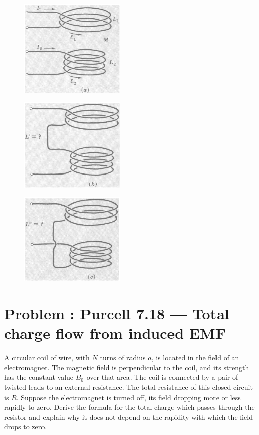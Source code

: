 \documentclass[problems]{esg8022pset}
\begin{document}
  \begin{figure}[H]
    \centering
    \includegraphics[width = 5cm]{pu711a}
    \label{fig:pu711a}
  \end{figure}


  \begin{figure}[H]
    \centering
    \includegraphics[width = 5cm]{pu711b}
    \label{fig:pu711b}
  \end{figure}

  \begin{figure}[H]
    \centering
    \includegraphics[width = 5cm]{pu711c}
    \label{fig:pu711c}
  \end{figure}


\section{Problem \thesection: Purcell 7.18 --- Total charge flow from induced EMF}
A circular coil of wire, with $N$ turns of radius $a$, is located in the field of an electromagnet.
The magnetic field is perpendicular to the coil, and its strength has the constant value $B_{0}$ over that area.
The coil is connected by a pair of twisted leads to an external resistance. The total resistance of this closed
 circuit is $R$. Suppose the electromagnet is turned off, its field dropping more or less rapidly to zero. Derive
  the formula for the total charge which passes through the resistor and explain why it does not depend on the rapidity
  with which the field drops to zero.
\end{document}
